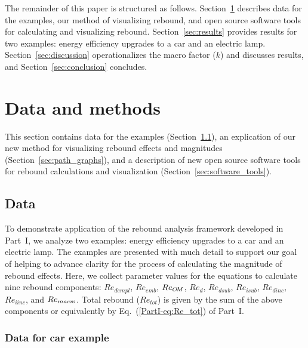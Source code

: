 \documentclass[12pt]{article}\usepackage[]{graphicx}\usepackage[]{xcolor}
\begin{document}
The remainder of this paper is structured as follows.
Section~\ref{sec:methods} describes data for the examples,
our method of visualizing rebound, and
open source software tools for calculating and visualizing rebound.
Section~\ref{sec:results} provides results for two examples:
energy efficiency upgrades to a car and an electric lamp.
Section~\ref{sec:discussion} operationalizes the macro factor ($k$)
and discusses results, and
Section~\ref{sec:conclusion} concludes.


\section{Data and methods}
\label{sec:methods}

This section contains data for the examples
(Section~\ref{sec:data}),
an explication of our new method for visualizing rebound effects and magnitudes
(Section~\ref{sec:path_graphs}), and
a description of new open source software tools
for rebound calculations and visualization
(Section~\ref{sec:software_tools}).


\subsection{Data}
\label{sec:data}



To demonstrate application of the rebound analysis framework
developed in Part~I,
we analyze two examples:
energy efficiency upgrades to a car and an electric lamp.
The examples are presented with much detail
to support our goal of helping to advance clarity for the process
of calculating the magnitude of rebound effects.
Here, we collect parameter values
for the equations to calculate
nine rebound components:
$Re_{dempl}$,
$Re_{emb}$,
$Re_{O\!M}$,
$Re_d$,
$Re_{dsub}$,
$Re_{isub}$,
$Re_{dinc}$,
$Re_{iinc}$, and
$Re_{macr\!o}$.
Total rebound
($Re_{tot}$)
is given by the sum of the above components
or equivalently by Eq.~(\ref{PartI-eq:Re_tot}) of Part~I.


\subsubsection{Data for car example}
\label{sec:data_car_example}
\end{document}
